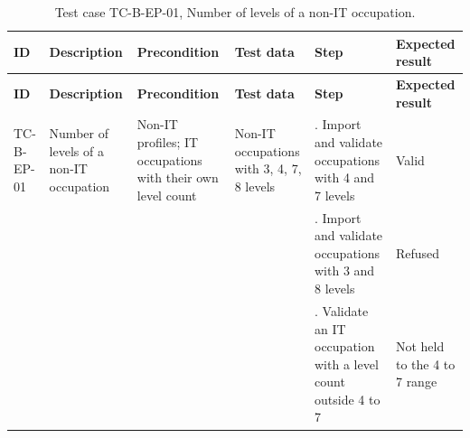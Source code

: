 {\footnotesize{}\renewcommand{\arraystretch}{1.1}
\begin{longtable}{|>{\raggedright\arraybackslash}p{}|>{\raggedright\arraybackslash}p{}|>{\raggedright\arraybackslash}p{}|>{\raggedright\arraybackslash}p{}|>{\raggedright\arraybackslash}p{}|>{\raggedright\arraybackslash}p{}|}
\caption{Test case TC-B-EP-01, Number of levels of a non-IT occupation.} \\
\hline
\textbf{ID} & \textbf{Description} & \textbf{Precondition} & \textbf{Test data} & \textbf{Step} & \textbf{Expected result} \\ \hline
\endfirsthead
\hline
\textbf{ID} & \textbf{Description} & \textbf{Precondition} & \textbf{Test data} & \textbf{Step} & \textbf{Expected result} \\ \hline
\endhead
TC-B-EP-01 & Number of levels of a non-IT occupation & Non-IT profiles; IT occupations with their own level count & Non-IT occupations with 3, 4, 7, 8 levels & 1. Import and validate occupations with 4 and 7 levels & Valid \\ \cline{5-6}
 &  &  &  & 2. Import and validate occupations with 3 and 8 levels & Refused \\ \cline{5-6}
 &  &  &  & 3. Validate an IT occupation with a level count outside 4 to 7 & Not held to the 4 to 7 range \\ \hline
\end{longtable}
}

